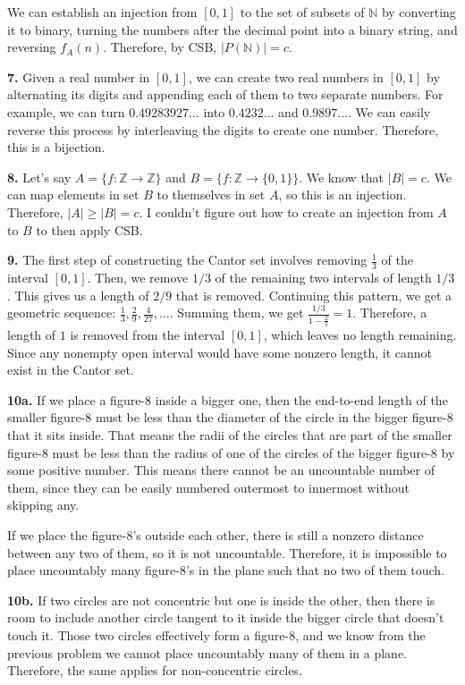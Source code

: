 \documentclass{article}
\begin{document}
We can establish an injection from $[0, 1]$ to the set of subsets of $\mathbb{N}$ by converting it to binary, turning the numbers after the decimal point into a binary string, and reversing $f_A(n)$. Therefore, by CSB, $|P(\mathbb{N})| = c$.
\newline

\textbf{7.} Given a real number in $[0, 1]$, we can create two real numbers in $[0, 1]$ by alternating its digits and appending each of them to two separate numbers. For example, we can turn $0.49283927...$ into $0.4232...$ and $0.9897...$. We can easily reverse this process by interleaving the digits to create one number. Therefore, this is a bijection.
\newline

\textbf{8.} Let's say $A = \{f: \mathbb{Z} \rightarrow \mathbb{Z}\}$ and $B = \{f: \mathbb{Z} \rightarrow \{0, 1\}\}$. We know that $|B| = c$. We can map elements in set $B$ to themselves in set $A$, so this is an injection. Therefore, $|A| \ge |B| = c$. I couldn't figure out how to create an injection from $A$ to $B$ to then apply CSB.
\newline

\textbf{9.} The first step of constructing the Cantor set involves removing $\frac{1}{3}$ of the interval $[0, 1]$. Then, we remove $1/3$ of the remaining two intervals of length $1/3$. This gives us a length of $2/9$ that is removed. Continuing this pattern, we get a geometric sequence: $\frac{1}{3}, \frac{2}{9}, \frac{4}{27}, \ldots$. Summing them, we get $\frac{1/3}{1-\frac{2}{3}} = 1$. Therefore, a length of $1$ is removed from the interval $[0, 1]$, which leaves no length remaining. Since any nonempty open interval would have some nonzero length, it cannot exist in the Cantor set.
\newline

\textbf{10a.} If we place a figure-8 inside a bigger one, then the end-to-end length of the smaller figure-8 must be less than the diameter of the circle in the bigger figure-8 that it sits inside. That means the radii of the circles that are part of the smaller figure-8 must be less than the radius of one of the circles of the bigger figure-8 by some positive number. This means there cannot be an uncountable number of them, since they can be easily numbered outermost to innermost without skipping any.
\newline

If we place the figure-8's outside each other, there is still a nonzero distance between any two of them, so it is not uncountable. Therefore, it is impossible to place uncountably many figure-8's in the plane such that no two of them touch.
\newline

\textbf{10b.} If two circles are not concentric but one is inside the other, then there is room to include another circle tangent to it inside the bigger circle that doesn't touch it. Those two circles effectively form a figure-8, and we know from the previous problem we cannot place uncountably many of them in a plane. Therefore, the same applies for non-concentric circles.
\end{document}
